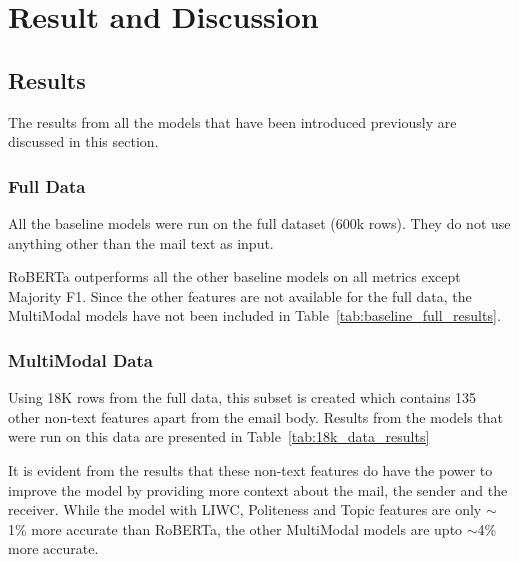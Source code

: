 
\chapter{Result and Discussion} %

\label{Chapter5} %



\section{Results}

The results from all the models that have been introduced previously are discussed in this section.

\subsection{Full Data}

All the baseline models were run on the full dataset (600k rows). They do not use anything other than the mail text as input. 


RoBERTa outperforms all the other baseline models on all metrics except Majority F1. Since the other features are not available for the full data, the MultiModal models have not been included in Table~\ref{tab:baseline_full_results}.

\subsection{MultiModal Data}

Using 18K rows from the full data, this subset is created which contains 135 other non-text features apart from the email body. Results from the models that were run on this data are presented in Table~\ref{tab:18k_data_results}



It is evident from the results that these non-text features do have the power to improve the model by providing more context about the mail, the sender and the receiver. While the model with LIWC, Politeness and Topic features are only $\sim$1\% more accurate than RoBERTa, the other MultiModal models are upto $\sim$4\% more accurate.


